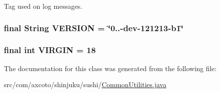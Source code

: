 \-Tag used on log messages. \hypertarget{classcom_1_1axcoto_1_1shinjuku_1_1sushi_1_1_common_utilities_a105e560486f3a1da9e93f217457721f3}{
\subsubsection[{\-V\-E\-R\-S\-I\-O\-N}]{\setlength{\rightskip}{0pt plus 5cm}final \-String {\bf \-V\-E\-R\-S\-I\-O\-N} = \char`\"{}0..-\/dev-\/121213-\/b1\char`\"{}}}\label{classcom_1_1axcoto_1_1shinjuku_1_1sushi_1_1_common_utilities_a105e560486f3a1da9e93f217457721f3}
\hypertarget{classcom_1_1axcoto_1_1shinjuku_1_1sushi_1_1_common_utilities_a407e41a2127125cd417c1fc9a6e386d3}{
\subsubsection[{\-V\-I\-R\-G\-I\-N}]{\setlength{\rightskip}{0pt plus 5cm}final int {\bf \-V\-I\-R\-G\-I\-N} = 18}}\label{classcom_1_1axcoto_1_1shinjuku_1_1sushi_1_1_common_utilities_a407e41a2127125cd417c1fc9a6e386d3}


\-The documentation for this class was generated from the following file\-:\begin{DoxyCompactItemize}
\item 
src/com/axcoto/shinjuku/sushi/\hyperlink{_common_utilities_8java}{\-Common\-Utilities.\-java}\end{DoxyCompactItemize}
